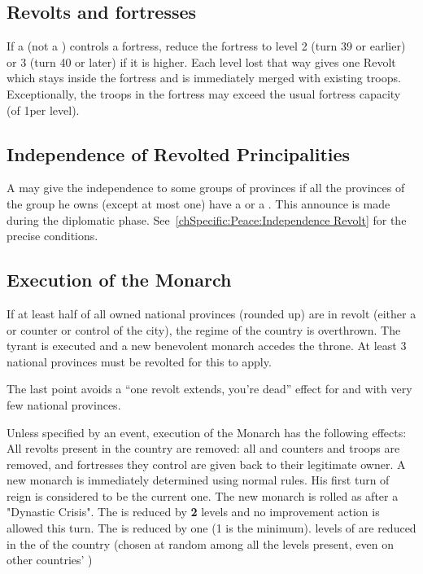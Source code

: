 \subsection{Revolts and fortresses}
\aparag If a \REVOLT (not a \REBELLION) controls a fortress, reduce the
fortress to level 2 (turn 39 or earlier) or 3 (turn 40 or later) if it is
higher.
\bparag Each level lost that way gives one Revolt \LD which stays inside the
fortress and is immediately merged with existing troops. Exceptionally, the
troops in the fortress may exceed the usual fortress capacity (of 1\LD per
level).

\subsection{Independence of Revolted Principalities}\label{chRedep:Peace:Independence Revolt}
\aparag A \MAJ may give the independence to some groups of provinces if all
the provinces of the group he owns (except at most one) have a \REVOLT or a
\REBELLION. This announce is made during the diplomatic
phase. See~\ref{chSpecific:Peace:Independence Revolt} for the precise
conditions.


\subsection{Execution of the Monarch}\label{chRedep:Execution Monarch by
  Revolts}
\aparag If at least half of all owned national provinces (rounded up) are in
revolt (either a \REVOLT or \REBELLION counter or control of the city), the
regime of the country is overthrown. The tyrant is executed and a new
benevolent monarch accedes the throne.
\bparag At least 3 national provinces must be revolted for this to apply.

\begin{designnote}
  The last point avoids a ``one revolt extends, you're dead'' effect for \PRU
  and \VEN with very few national provinces.
\end{designnote}

\aparag[Consequences] Unless specified by an event, execution of the
Monarch has the following effects:
\bparag All revolts present in the country are removed: all \REVOLT and
\REBELLION counters and troops are removed, and fortresses they control are
given back to their legitimate owner.
\bparag A new monarch is immediately determined using normal rules. His first
turn of reign is considered to be the current one. The new
monarch is rolled as after a "Dynastic Crisis".
\bparag The \STAB is reduced by \textbf{2} levels %
and no \STAB improvement action is allowed this turn.
\bparag The \DTI is reduced by one (1 is the minimum).
 levels of \TradeFLEET are reduced in the \CTZ of the country (chosen
at random among all the levels present, even on other countries' \TradeFLEET)

